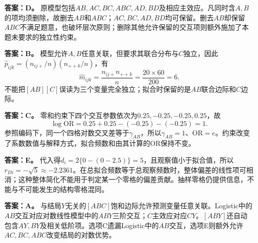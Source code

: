 \textbf{答案：D。} 原模型包括$AB,AC,BC,ABC,AD,BD$及相应主效应。凡同时含$A,B$的项均须删除，故删去$AB$和$ABC$；$AC,BC,AD,BD$均可保留。删去$AB$却保留$ABC$不满足题意，也破坏层次原则；删除其他允许保留的交互项则额外施加了本题未要求的独立性约束。
\par\nobreak\smallskip{}

\textbf{答案：B。} 模型允许$A,B$任意关联，但要求其联合分布与$C$独立，因此$\widehat p_{ijk}=(n_{ij+}/n)(n_{++k}/n)$，有\[\widehat m_{ijk}=\frac{n_{ij+}n_{++k}}{n}=\frac{20\times60}{200}=6.\]不能把$[AB][C]$误读为三个变量完全独立；拟合时保留的是$AB$联合边际和$C$边际。
\par\nobreak\smallskip{}

\textbf{答案：C。} 零和约束下四个交互参数依次为$0.25,-0.25,-0.25,0.25$，故\[\log\mathrm{OR}=0.25+0.25-(-0.25)-(-0.25)=1.\]参照编码下，同一个四格对数交叉差等于$\gamma_{AB}$，所以$\gamma_{AB}=1$、$\mathrm{OR}=e$。约束改变了系数数值与解释方式，拟合频数和由其计算的OR保持不变。
\par\nobreak\smallskip{}

\textbf{答案：E。} 代入得$d_i=2\{0-(0-2.5)\}=5$，且观察值小于拟合值，所以$r_{Di}=-\sqrt5\approx-2.2361$。在总拟合频数等于总观察频数时，整体偏差的线性项可相消；这种整体简化不能用于判定某一个零格的偏差贡献。抽样零格仍提供信息，不能与不可能发生的结构零格混同。
\par\nobreak\smallskip{}

\textbf{答案：A。} 与结局$Y$无关的$[ABC]$饱和边际允许预测变量任意关联。Logistic中的$AB$交互对应对数线性模型中的$ABY$三阶交互；$C$主效应对应$CY$。$[ABY]$还自动包含$AY,BY$及相关低阶项。选项C遗漏Logistic中的$AB$交互，选项E则额外允许$AC,BC,ABC$改变结局的对数优势。
\par\nobreak\smallskip{}

